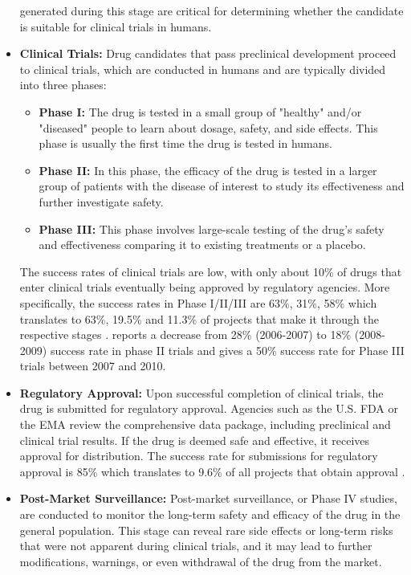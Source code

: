 \begin{itemize}
	      generated during this stage are critical for determining whether the candidate is
	      suitable for clinical trials in humans.
	\item \textbf{Clinical Trials:} Drug candidates that pass preclinical development proceed to
	      clinical trials, which are conducted in humans and are typically divided into three phases:
	      \begin{itemize}
		      \item \textbf{Phase I:} The drug is tested in a small group of "healthy" and/or "diseased" people to learn about
		            dosage, safety, and side effects. This phase is usually the first time the drug is tested in humans.
		      \item \textbf{Phase II:} In this phase, the efficacy of the drug is tested in a larger
		            group of patients with the disease of interest to study its effectiveness and further investigate safety.
		      \item \textbf{Phase III:} This phase involves large-scale testing of the drug's safety
		            and effectiveness comparing it to existing treatments or a placebo.
	      \end{itemize}
	      The success rates of clinical trials are low, with only about 10\% of drugs that enter clinical
	      trials eventually being approved by regulatory agencies. More specifically, the success rates in
	      Phase I/II/III are 63\%, 31\%, 58\% which translates to 63\%, 19.5\% and 11.3\% of projects that
	      make it through the respective stages \citep{mullardParsingClinicalSuccess2016}. \citet{arrowsmithPhaseIIFailures2011}
		  reports a decrease from 28\% (2006-2007) to 18\% (2008-2009) success rate in phase II trials and \citet{arrowsmithPhaseIIISubmission2011}
		  gives a 50\% success rate for Phase III trials between 2007 and 2010.
	\item \textbf{Regulatory Approval:} Upon successful completion of clinical trials, the drug is
	      submitted for regulatory approval. Agencies such as the U.S. \Ac{FDA} or the \Ac{EMA}
	      review the comprehensive data package, including preclinical and clinical trial results.
	      If the drug is deemed safe and effective, it receives approval for distribution. The
	      success rate for submissions for regulatory approval is 85\% which translates to 9.6\% of
	      all projects that obtain approval \citep{mullardParsingClinicalSuccess2016}.
	\item \textbf{Post-Market Surveillance:} Post-market surveillance, or Phase IV studies, are
	      conducted to monitor the long-term safety and efficacy of the drug in the general population.
	      This stage can reveal rare side effects or long-term risks that were not apparent during
	      clinical trials, and it may lead to further modifications, warnings, or even withdrawal of the
	      drug from the market.
\end{itemize}

